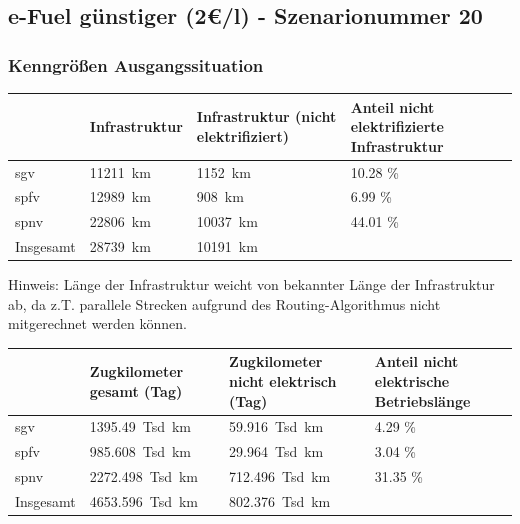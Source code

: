 \subsection{e-Fuel günstiger (2€/l) - Szenarionummer 20}\label{chap_kenngrößen_s_20}

\subsubsection{Kenngrößen Ausgangssituation}
\begin{center}
	\begin{tabularx}{\textwidth}{l | X | X | X} & Infrastruktur & Infrastruktur (nicht elektrifiziert) & Anteil nicht elektrifizierte Infrastruktur \\
	\hline
	\acrshort{sgv} & \SI{11211}{\km} & \SI{1152}{\km} & \num{10.28} \% \\
	\acrshort{spfv} & \SI{12989}{\km} & \SI{908}{\km} & \num{6.99} \% \\
	\acrshort{spnv} & \SI{22806}{\km} & \SI{10037}{\km} & \num{44.01} \% \\
	\hline
	Insgesamt & \SI{28739}{\km} & \SI{10191}{\km} & \\
	\end{tabularx}
\end{center}
\hspace{2em}

Hinweis: Länge der Infrastruktur weicht von bekannter Länge der Infrastruktur ab, da z.T. parallele Strecken aufgrund des Routing-Algorithmus nicht mitgerechnet werden können.

\begin{center}
	\begin{tabularx}{\textwidth}{l | X | X | X} & Zugkilometer gesamt (Tag) & Zugkilometer nicht elektrisch (Tag) & Anteil nicht elektrische Betriebslänge \\
	\hline
	\acrshort{sgv} & \SI{1395.49}{Tsd. \km} & \SI{59.916}{Tsd. \km} & \num{4.29}  \% \\
	\acrshort{spfv} & \SI{985.608}{Tsd. \km} & \SI{29.964}{Tsd. \km} & \num{3.04} \% \\
	\acrshort{spnv} & \SI{2272.498}{Tsd. \km} & \SI{712.496}{Tsd. \km} & \num{31.35} \% \\
	\hline
	Insgesamt & \SI{4653.596}{Tsd. \km} & \SI{802.376}{Tsd. \km} & \\
	\end{tabularx}
\end{center}


